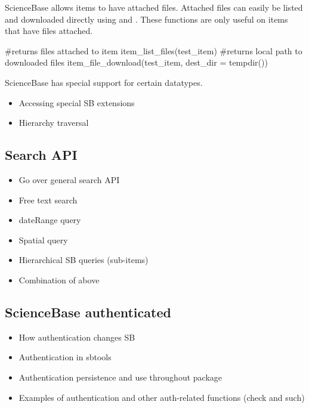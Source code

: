ScienceBase allows items to have attached files. Attached files can easily be 
listed and downloaded directly using  and 
. These functions are only useful on items 
that have files attached.

\begin{example}
#returns files attached to item
item_list_files(test_item)
#returns local path to downloaded files
item_file_download(test_item, dest_dir = tempdir())
\end{example}

ScienceBase has special support for certain datatypes. 

\begin{example}
	
\end{example}

\begin{itemize}
	\item{Accessing special SB extensions}
	\item{Hierarchy traversal}
\end{itemize}


\subsection{Search API}
\begin{itemize}
	\item{Go over general search API}
	\item{Free text search}
	\item{dateRange query}
	\item{Spatial query}
	\item{Hierarchical SB queries (sub-items)}
	\item{Combination of above}
\end{itemize}

\subsection{ScienceBase authenticated}

\begin{itemize}
	\item{How authentication changes SB}
	\item{Authentication in sbtools}
	\item{Authentication persistence and use throughout package}
	\item{Examples of authentication and other auth-related functions (check and such)}
\end{itemize}


